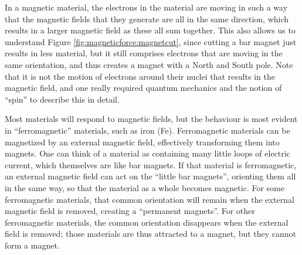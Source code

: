 
In a magnetic material, the electrons in the material are moving in such a way that the magnetic fields that they generate are all in the same direction, which results in a larger magnetic field as these all sum together. This also allows us to understand Figure \ref{fig:magneticforce:magnetcut}, since cutting a bar magnet just results in less material, but it still comprises electrons that are moving in the same orientation, and thus creates a magnet with a North and South pole. Note that it is not the motion of electrons around their nuclei that results in the magnetic field, and one really required quantum mechanics and the notion of ``spin'' to describe this in detail. 
 
Most materials will respond to magnetic fields, but the behaviour is most evident in ``ferromagnetic'' materials, such as iron (Fe). Ferromagnetic materials can be magnetized by an external magnetic field, effectively transforming them into magnets. One can think of a material as containing many little loops of electric current, which themselves are like bar magnets. If that material is ferromagnetic,  an external magnetic field can act on the ``little bar magnets'', orienting them all in the same way, so that the material as a whole becomes magnetic. For some ferromagnetic materials, that common orientation will remain when the external magnetic field is removed, creating a ``permanent magnets''. For other ferromagnetic materials, the common orientation disappears when the external field is removed; those materials are thus attracted to a magnet, but they cannot form a magnet. 
  
